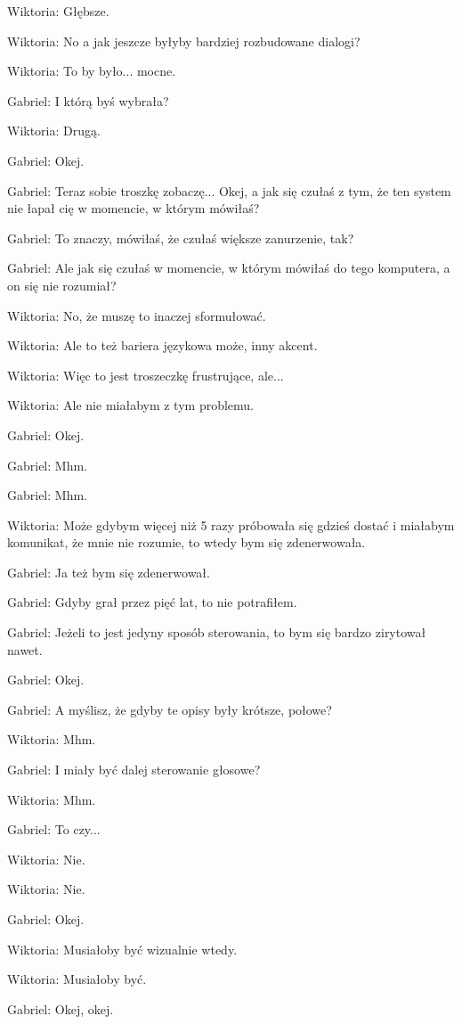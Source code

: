 Wiktoria: Głębsze.

Wiktoria: No a jak jeszcze byłyby bardziej rozbudowane dialogi?

Wiktoria: To by było... mocne.

Gabriel: I którą byś wybrała?

Wiktoria: Drugą.

Gabriel: Okej.

Gabriel: Teraz sobie troszkę zobaczę... Okej, a jak się czułaś z tym, że ten system nie łapał cię w momencie, w którym mówiłaś?

Gabriel: To znaczy, mówiłaś, że czułaś większe zanurzenie, tak?

Gabriel: Ale jak się czułaś w momencie, w którym mówiłaś do tego komputera, a on się nie rozumiał?

Wiktoria: No, że muszę to inaczej sformułować.

Wiktoria: Ale to też bariera językowa może, inny akcent.

Wiktoria: Więc to jest troszeczkę frustrujące, ale...

Wiktoria: Ale nie miałabym z tym problemu.

Gabriel: Okej.

Gabriel: Mhm.

Gabriel: Mhm.

Wiktoria: Może gdybym więcej niż 5 razy próbowała się gdzieś dostać i miałabym komunikat, że mnie nie rozumie, to wtedy bym się zdenerwowała.

Gabriel: Ja też bym się zdenerwował.

Gabriel: Gdyby grał przez pięć lat, to nie potrafiłem.

Gabriel: Jeżeli to jest jedyny sposób sterowania, to bym się bardzo zirytował nawet.

Gabriel: Okej.

Gabriel: A myślisz, że gdyby te opisy były krótsze, połowe?

Wiktoria: Mhm.

Gabriel: I miały być dalej sterowanie głosowe?

Wiktoria: Mhm.

Gabriel: To czy...

Wiktoria: Nie.

Wiktoria: Nie.

Gabriel: Okej.

Wiktoria: Musiałoby być wizualnie wtedy.

Wiktoria: Musiałoby być.

Gabriel: Okej, okej.

